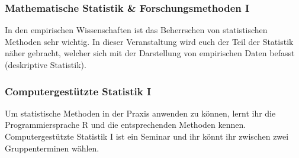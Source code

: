 \subsubsection*{Mathematische Statistik \& Forschungsmethoden I}
In den empirischen Wissenschaften ist das Beherrschen von statistischen Methoden sehr wichtig. In dieser Veranstaltung wird euch der Teil der Statistik näher gebracht, welcher sich mit der Darstellung von empirischen Daten befasst (deskriptive Statistik). 

\subsubsection*{Computergestützte Statistik I}
Um statistische Methoden in der Praxis anwenden zu können, lernt ihr die Programmiersprache R und die entsprechenden Methoden kennen. Computergestützte Statistik I ist ein Seminar und ihr könnt ihr zwischen zwei Gruppenterminen wählen.